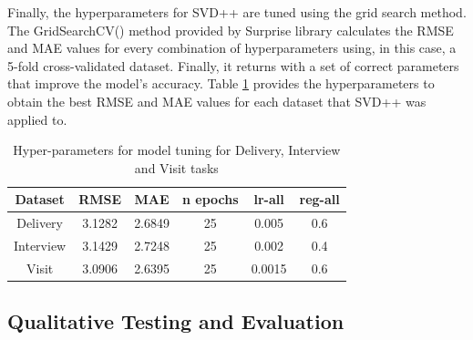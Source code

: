 \documentclass{aifyp}
\begin{document}
\indent Finally, the hyperparameters for SVD++ are tuned using the grid search method. The GridSearchCV() method provided by Surprise library calculates the RMSE and MAE values for every combination of hyperparameters using, in this case, a 5-fold cross-validated dataset. Finally, it returns with a set of correct parameters that improve the model's accuracy. Table \ref{tab:Hyperparams} provides the hyperparameters to obtain the best RMSE and MAE values for each dataset that SVD++ was applied to.
\begin{table}[h]
\begin{center}
\begin{tabular}{|c|c|c|c|c|c|}
\hline
\textbf{Dataset} & \textbf{RMSE} & \textbf{MAE} & \textbf{n epochs} & \textbf{lr-all} & \textbf{reg-all}\\ \hline
Delivery & 3.1282 & 2.6849 & 25 & 0.005 & 0.6\\ \hline
Interview & 3.1429 & 2.7248 & 25 & 0.002 & 0.4\\ \hline
Visit & 3.0906 & 2.6395 & 25 & 0.0015 & 0.6\\ \hline
\end{tabular}
\caption{Hyper-parameters for model tuning for Delivery, Interview and Visit tasks}
\label{tab:Hyperparams}
\end{center}
\end{table}

\subsection{Qualitative Testing and Evaluation}
\end{document}
